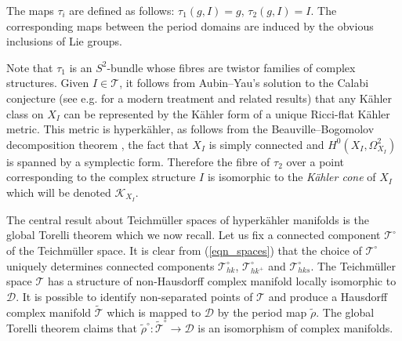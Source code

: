 \documentclass[11pt]{article}
\newcommand{\6}{\partial}
\newcommand{\KK}{\mathcal{K}}
\newcommand{\Teich}{\mathcal{T}}
\newcommand{\TeichHK}{\Teich_{h\!k}}
\newcommand{\TeichHKa}{\Teich_{h\!k^+}}
\newcommand{\TeichHKb}{\Teich_{h\!k\!s}}
\newcommand{\TeichCS}{\Teich_{cs}}
\newcommand{\Dom}{\mathcal{D}}
\newcommand{\DomHKa}{\Dom_{h\!k^+}}
\newcommand{\DomHKb}{\Dom_{h\!k\!s}}
\newcommand{\DomCS}{\Dom_{cs}}
\newcommand{\Per}{\rho}
\newcommand{\PerHKb}{\Per_{h\!k\!s}}
\begin{document}
The maps $\tau_i$ are defined as follows: $\tau_1(g,I) = g$, $\tau_2(g,I) = I$.
The corresponding maps between the period domains are induced by the obvious inclusions of Lie groups.

Note that $\tau_1$ is an $S^2$-bundle whose fibres are twistor families of complex structures.
Given $I\in \Teich$, it follows from Aubin--Yau's solution to the Calabi conjecture (see e.g. \cite{GZ} for
a modern treatment and related results)
that any K\"ahler class on $X_I$ can be represented by the K\"ahler form of a unique Ricci-flat
K\"ahler metric. This metric is hyperk\"ahler, as follows from the Beauville--Bogomolov decomposition theorem
\cite[Theorem 1]{Be}, the fact that $X_I$ is simply connected and $H^0(X_I,\Omega^2_{X_I})$ is spanned
by a symplectic form. Therefore the fibre of $\tau_2$ over a point corresponding to the complex structure $I$ is isomorphic
to the {\it K\"ahler cone} of $X_I$ which will be denoted $\KK_{X_I}$.

The central result about Teichm\"uller spaces of hyperk\"ahler manifolds is the global Torelli
theorem \cite{V1} which we now recall. Let us fix a connected component $\Teich^\circ$ of the Teichm\"uller space.
It is clear from (\ref{eqn_spaces}) that the choice of $\Teich^\circ$ uniquely determines connected
components $\TeichHK^\circ$, $\TeichHKa^\circ$ and $\TeichHKb^\circ$.%
The Teichm\"uller space $\Teich$ has a structure of non-Hausdorff complex manifold locally isomorphic
to $\Dom$. It is possible to identify non-separated points of $\Teich$ and produce a Hausdorff
complex manifold $\widetilde{\Teich}$ which is mapped to $\Dom$ by the period map $\tilde{\Per}$.
The global Torelli theorem \cite[Theorem 4.29]{V1} claims that $\tilde{\Per}^\circ\colon\widetilde{\Teich}^\circ\to\Dom$
is an isomorphism of complex manifolds.
\end{document}
